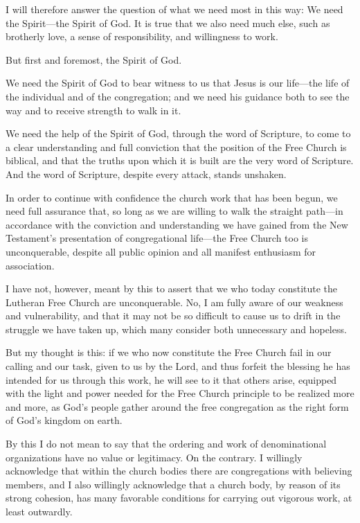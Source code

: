 I will therefore answer the question of what we need most in this way: We need the Spirit—the Spirit of God. It is true that we also need much else, such as brotherly love, a sense of responsibility, and willingness to work.

But first and foremost, the Spirit of God.

We need the Spirit of God to bear witness to us that Jesus is our life—the life of the individual and of the congregation; and we need his guidance both to see the way and to receive strength to walk in it.

We need the help of the Spirit of God, through the word of Scripture, to come to a clear understanding and full conviction that the position of the Free Church is biblical, and that the truths upon which it is built are the very word of Scripture. And the word of Scripture, despite every attack, stands unshaken.

In order to continue with confidence the church work that has been begun, we need full assurance that, so long as we are willing to walk the straight path—in accordance with the conviction and understanding we have gained from the New Testament’s presentation of congregational life—the Free Church too is unconquerable, despite all public opinion and all manifest enthusiasm for association.

I have not, however, meant by this to assert that we who today constitute the Lutheran Free Church are unconquerable. No, I am fully aware of our weakness and vulnerability, and that it may not be so difficult to cause us to drift in the struggle we have taken up, which many consider both unnecessary and hopeless.

But my thought is this: if we who now constitute the Free Church fail in our calling and our task, given to us by the Lord, and thus forfeit the blessing he has intended for us through this work, he will see to it that others arise, equipped with the light and power needed for the Free Church principle to be realized more and more, as God’s people gather around the free congregation as the right form of God’s kingdom on earth.

By this I do not mean to say that the ordering and work of denominational organizations have no value or legitimacy. On the contrary. I willingly acknowledge that within the church bodies there are congregations with believing members, and I also willingly acknowledge that a church body, by reason of its strong cohesion, has many favorable conditions for carrying out vigorous work, at least outwardly.

